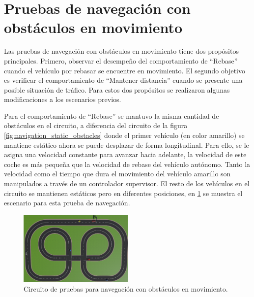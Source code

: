 \section{Pruebas de navegación con obstáculos en movimiento} \label{sec:pruebas_de_navegación_con_obstáculos_en_movimiento}

Las pruebas de navegación con obstáculos en movimiento tiene dos propósitos principales. Primero, observar el desempeño del comportamiento de ``Rebase'' cuando el vehículo por rebasar se encuentre en movimiento. El segundo objetivo es verificar el comportamiento de ``Mantener distancia'' cuando se presente una posible situación de tráfico. Para estos dos propósitos se realizaron algunas modificaciones a los escenarios previos.

Para el comportamiento de ``Rebase'' se mantuvo la misma cantidad de obstáculos en el circuito, a diferencia del circuito de la figura \ref{fig:navigation_static_obstacles} donde el primer vehículo (en color amarillo) se mantiene estático ahora se puede desplazar de forma longitudinal. Para ello, se le asigna una velocidad constante para avanzar hacia adelante, la velocidad de este coche es más pequeña que la velocidad de rebase del vehículo autónomo. Tanto la velocidad como el tiempo que dura el movimiento del vehículo amarillo son manipulados a través de un controlador supervisor. El resto de los vehículos en el circuito se mantienen estáticos pero en diferentes posiciones, en \ref{fig:navigation_dynamic_obstacles} se muestra el escenario para esta prueba de navegación.
\begin{figure}[h]
    \centering
    \includegraphics[width=0.5\textwidth]{Figures/Figures_Cap07/navigation_dynamic_obstacles.png}
    \caption{Circuito de pruebas para navegación con obstáculos en movimiento.}
    \label{fig:navigation_dynamic_obstacles}
\end{figure}

